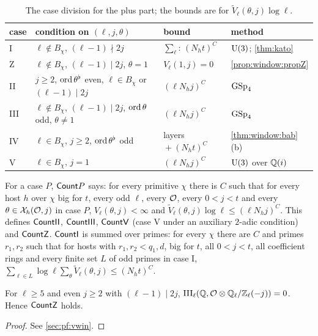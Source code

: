 \begin{table}[ht]
\centering\small
\begin{tabular}{@{}llll@{}}
\toprule
case & condition on $(\ell,j,\theta)$ & bound & method \\
\midrule
I & $\ell\notin B_\chi$, $(\ell-1)\nmid2j$ & $\sum_\ell$: $(N_ht)^C$ & $\operatorname{U}(3)$; \cref{thm:kato}\\
Z & $\ell\notin B_\chi$, $(\ell-1)\mid2j$, $\theta=1$ & $V_\ell(1,j)=0$ & \cref{prop:window:propZ}\\
II & $j\ge2$, $\operatorname{ord}\theta^\flat$ even, $\ell\in B_\chi$ or $(\ell-1)\mid2j$ & $(\ell N_hj)^C$ & $\operatorname{GSp}_4$\\
III & $\ell\notin B_\chi$, $(\ell-1)\mid2j$, $\operatorname{ord}\theta$ odd, $\theta\ne1$ & $(\ell N_hj)^C$ & $\operatorname{GSp}_4$\\
IV & $\ell\in B_\chi$, $j\ge2$, $\operatorname{ord}\theta^\flat$ odd & layers${}+(N_ht)^C$ & \cref{thm:window:bab}(b)\\
V & $\ell\in B_\chi$, $j=1$ & $(\ell N_hj)^C$ & $\operatorname{U}(3)$ over $\mathbb{Q}(i)$\\
\bottomrule
\end{tabular}
\caption{The case division for the plus part; the bounds are for $\widetilde V_\ell(\theta,j)\log\ell$.}\label{tab:window:cases}
\end{table}

\begin{definition}[Counts]\label{def:window:counts}
For a case $P$, $\mathsf{Count}P$ says: for every primitive $\chi$ there is $C$ such that for every host $h$ over
$\chi$ big for $t$, every odd $\ell$, every $\mathcal{O}$, every $0<j<t$ and every $\theta\in\mathcal{X}_h(\mathcal{O},j)$ in case $P$,
$V_\ell(\theta,j)<\infty$ and $\widetilde V_\ell(\theta,j)\log\ell\le(\ell N_hj)^C$. This defines $\mathsf{CountII}$,
$\mathsf{CountIII}$, $\mathsf{CountV}$ (case V under an auxiliary $2$-adic condition) and $\mathsf{CountZ}$.
$\mathsf{CountI}$ is summed over primes: for every $\chi$ there are $C$ and primes $r_1,r_2$ such that for hosts with
$r_1,r_2<q_1,d$, big for $t$, all $0<j<t$, all coefficient rings and every finite set $L$ of odd primes in case I,
$\sum_{\ell\in L}\log\ell\sum_{\theta}\widetilde V_\ell(\theta,j)\le(N_ht)^C$.
\end{definition}

\begin{proposition}\Fmark\label{prop:window:propZ}
For $\ell\ge5$ and even $j\ge2$ with $(\ell-1)\mid2j$, $\mathrm{III}_\ell(\mathbb{Q},\mathcal{O}\otimes\mathbb{Q}_\ell/\mathbb{Z}_\ell(-j))=0$. Hence $\mathsf{CountZ}$
holds.
\end{proposition}
\begin{proof}See \cref{sec:pf:vwin}.
\end{proof}


